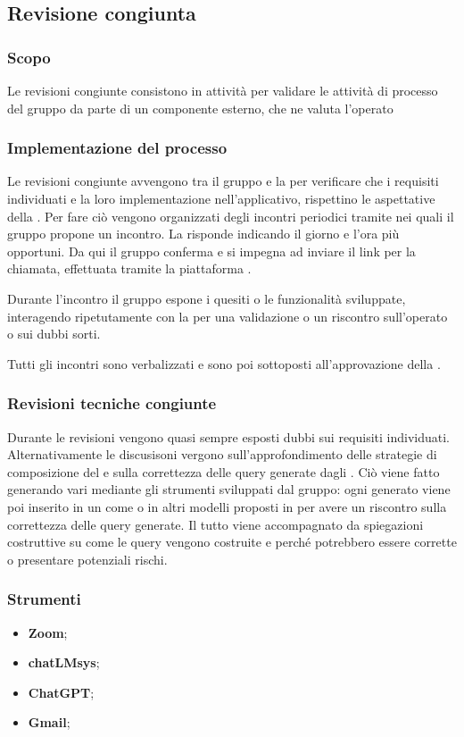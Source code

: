 \subsection{Revisione congiunta}\label{revisione_congiunta}

\subsubsection{Scopo}
\par Le revisioni congiunte consistono in attività per validare le attività di processo del gruppo da parte di un componente esterno, che ne valuta l'operato

\subsubsection{Implementazione del processo}
\par Le revisioni congiunte avvengono tra il gruppo e la  per verificare che i requisiti individuati e la loro implementazione nell'applicativo, rispettino le aspettative della . Per fare ciò vengono organizzati degli incontri periodici tramite  nei quali il gruppo propone un incontro. La  risponde indicando il giorno e l'ora più opportuni. Da qui il gruppo conferma e si impegna ad inviare il link per la chiamata, effettuata tramite la piattaforma .
\par Durante l'incontro il gruppo espone i quesiti o le funzionalità sviluppate, interagendo ripetutamente con la  per una validazione o un riscontro sull'operato o sui dubbi sorti.
\par Tutti gli incontri sono verbalizzati e sono poi sottoposti all'approvazione della .

\subsubsection{Revisioni tecniche congiunte}
\par Durante le revisioni vengono quasi sempre esposti dubbi sui requisiti individuati. Alternativamente le discusisoni vergono sull'approfondimento delle strategie di composizione del  e sulla correttezza delle query generate dagli . Ciò viene fatto generando vari  mediante gli strumenti sviluppati dal gruppo: ogni  generato viene poi inserito in un  come  o in altri modelli proposti in  per avere un riscontro sulla correttezza delle query generate. Il tutto viene accompagnato da spiegazioni costruttive su come le query vengono costruite e perché potrebbero essere corrette o presentare potenziali rischi.

\subsubsection{Strumenti}
\IntroStrumenti
\begin{itemize}
    \item \textbf{Zoom};
    \item \textbf{chatLMsys};
    \item \textbf{ChatGPT};
    \item \textbf{Gmail};
\end{itemize}